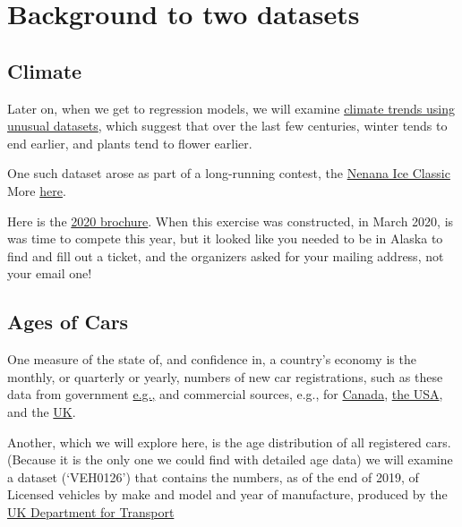 \documentclass[]{book}
\begin{document}
\hypertarget{background-to-two-datasets}{%
\section{Background to two datasets}\label{background-to-two-datasets}}

\hypertarget{climate}{%
\subsection{Climate}\label{climate}}

Later on, when we get to regression models, we will examine \href{http://www.medicine.mcgill.ca/epidemiology/hanley/c678/index.html\#anthropometricData}{climate trends using unusual datasets}, which suggest that over the last few centuries, winter tends to end earlier, and plants tend to flower earlier.

One such dataset arose as part of a long-running contest, the \href{http://www.nenanaakiceclassic.com}{Nenana Ice Classic}
More \href{http://www.john-daly.com/nenana.htm}{here}.

Here is the \href{http://www.medicine.mcgill.ca/epidemiology/hanley/bios691/Nenana2020Brochure.pdf}{2020 brochure}. When this exercise was constructed, in March 2020, is was time to compete this year, but it looked like you needed to be in Alaska to find and fill out a ticket, and the organizers asked for your mailing address, not your email one!

\hypertarget{ages-of-cars}{%
\subsection{Ages of Cars}\label{ages-of-cars}}

One measure of the state of, and confidence in, a country's economy is the monthly, or quarterly or yearly, numbers of new car registrations, such as these data from
government
\href{https://www150.statcan.gc.ca/t1/tbl1/en/tv.action?pid=2310006701}{e.g.,} and commercial sources, e.g., for
\href{https://tradingeconomics.com/canada/car-registrations}{Canada},
\href{https://tradingeconomics.com/united-states/car-registrations}{the USA}, and the
\href{https://tradingeconomics.com/united-kingdom/car-registrations}{UK}.

Another, which we will explore here, is the age distribution of all registered cars. (Because it is the only one we could find with detailed age data) we will examine a dataset (`VEH0126') that contains the numbers, as of the end of 2019, of Licensed vehicles by make and model and year of manufacture, produced by the \href{https://www.gov.uk/government/statistical-data-sets/all-vehicles-veh01}{UK Department for Transport}
\end{document}
